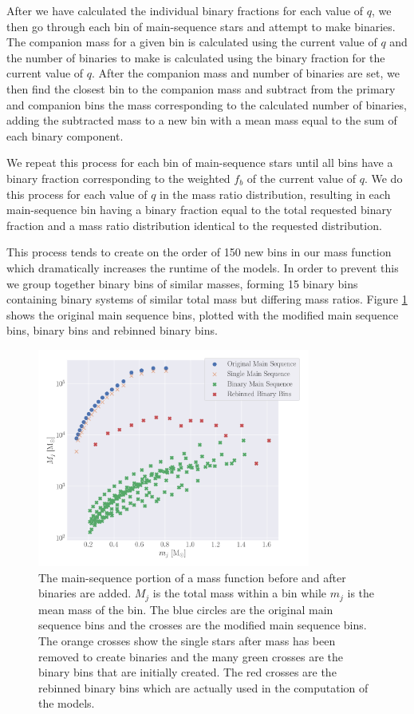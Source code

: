 After we have calculated the individual binary fractions for each value of $q$, we then go through
each bin of main-sequence stars and attempt to make binaries. The companion mass for a given bin is
calculated using the current value of $q$ and the number of binaries to make is calculated using the
binary fraction for the current value of $q$. After the companion mass and number of binaries are
set, we then find the closest bin to the companion mass and subtract from the primary and companion
bins the mass corresponding to the calculated number of binaries, adding the subtracted mass to a
new bin with a mean mass equal to the sum of each binary component.


We repeat this process for each bin of main-sequence stars until all bins have a binary fraction
corresponding to the weighted $f_b$ of the current value of $q$. We do this process for each value
of $q$ in the mass ratio distribution, resulting in each main-sequence bin having a binary fraction
equal to the total requested binary fraction and a mass ratio distribution identical to the
requested distribution.


This process tends to create on the order of 150 new bins in our mass function which dramatically
increases the runtime of the  models. In order to prevent this we group together binary
bins of similar masses, forming 15 binary bins containing binary systems of similar total mass but
differing mass ratios. Figure \ref{fig:2/shifted-mf} shows the original main sequence bins, plotted
with the modified main sequence bins, binary bins and rebinned binary bins.


\begin{figure}
    \centering
    \includegraphics[width=0.8\textwidth]{figures/shifted-mf.png}
    \caption{The main-sequence portion of a mass function before and after binaries are added. $M_j$
        is the total mass within a bin while $m_j$ is the mean mass of the bin. The blue circles are
        the original main sequence bins and the crosses are the modified main sequence bins. The orange
        crosses show the single stars after mass has been removed to create binaries and the many
        green crosses are the binary bins that are initially created. The red crosses are the
        rebinned binary bins which are actually used in the computation of the 
        models.}
    \label{fig:2/shifted-mf}
\end{figure}



